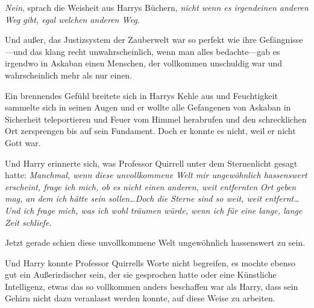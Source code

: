 \emph{Nein}, sprach die Weisheit aus Harrys Büchern, \emph{nicht wenn es irgendeinen anderen Weg gibt, egal welchen anderen Weg.}

Und außer, das Justizsystem der Zauberwelt war so perfekt wie ihre Gefängnisse—und das klang recht unwahrscheinlich, wenn man alles bedachte—gab es irgendwo in Askaban einen Menschen, der vollkommen unschuldig war und wahrscheinlich mehr als nur einen.

Ein brennendes Gefühl breitete sich in Harrys Kehle aus und Feuchtigkeit sammelte sich in seinen Augen und er wollte alle Gefangenen von Askaban in Sicherheit teleportieren und Feuer vom Himmel herabrufen und den schrecklichen Ort zersprengen bis auf sein Fundament. Doch er konnte es nicht, weil er nicht Gott war.

Und Harry erinnerte sich, was Professor Quirrell unter dem Sternenlicht gesagt hatte: \emph{Manchmal, wenn diese unvollkommene Welt mir ungewöhnlich hassenswert erscheint, frage ich mich, ob es nicht einen anderen, weit entfernten Ort geben mag, an dem ich hätte sein sollen…Doch die Sterne sind so weit, weit entfernt…Und ich frage mich, was ich wohl träumen würde, wenn ich für eine lange, lange Zeit schliefe.}

Jetzt gerade schien diese unvollkommene Welt ungewöhnlich hassenswert zu sein.

Und Harry konnte Professor Quirrells Worte nicht begreifen, es mochte ebenso gut ein Außerirdischer sein, der sie gesprochen hatte oder eine Künstliche Intelligenz, etwas das so vollkommen anders beschaffen war als Harry, dass sein Gehirn nicht dazu veranlasst werden konnte, auf diese Weise zu arbeiten.

